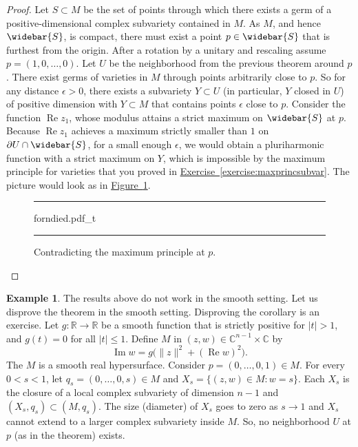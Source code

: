 \documentclass[12pt,openany]{book}
\renewcommand{\Re}{\operatorname{Re}}
\renewcommand{\Im}{\operatorname{Im}}
\newcommand{\sabs}[1]{\lvert {#1} \rvert}
\newcommand{\snorm}[1]{\lVert {#1} \rVert}
\newcommand{\C}{{\mathbb{C}}}
\newcommand{\R}{{\mathbb{R}}}
\theoremstyle{plain}
\theoremstyle{remark}
\theoremstyle{definition}
\newenvironment{myfig}{%
\begin{figure}[h!t]
\noindent\rule{\textwidth}{0.5pt}\vspace{12pt}\par\centering}%
{\par\noindent\rule{\textwidth}{0.5pt}
\end{figure}}
\theoremstyle{exercise}
\theoremstyle{example}
\newtheorem{example}[thm]{Example}
\newcommand{\figureref}[1]{\hyperref[#1]{Figure~\ref*{#1}}}
\newcommand{\exerciseref}[1]{\hyperref[#1]{Exercise~\ref*{#1}}}
\begin{document}
\begin{proof}
Let $S \subset M$ be the set of points through which there exists
a germ of a positive-dimensional complex subvariety contained in $M$.
As $M$, and hence $\widebar{S}$, is compact,
there must exist a point $p \in \widebar{S}$
that is furthest from
the origin.  After a rotation by a unitary and rescaling assume
$p=(1,0,\ldots,0)$.  Let $U$ be the neighborhood from the previous
theorem around $p$.  There exist germs of varieties in $M$ through points
arbitrarily close to $p$.  So for any distance $\epsilon > 0$,
there exists a subvariety $Y \subset U$ (in particular, $Y$ closed in $U$)
of positive dimension with $Y \subset M$ that contains points
$\epsilon$ close to $p$.  Consider the function $\Re z_1$, whose modulus attains a
strict maximum on $\widebar{S}$ at $p$.  Because $\Re z_1$ achieves a maximum
strictly smaller than $1$ on $\partial U \cap \widebar{S}$, for a small enough $\epsilon$,
we would obtain a pluriharmonic function with a strict
maximum on $Y$, which is impossible by the maximum principle for
varieties that you proved in \exerciseref{exercise:maxprincsubvar}.
The picture would look as in \figureref{fig:forndied}.
\begin{myfig}
\medskip
{forndied.pdf_t}
\caption{Contradicting the maximum principle at $p$.\label{fig:forndied}}
\end{myfig}
\end{proof}

\begin{example}
The results above do not work
in the smooth setting.  Let us disprove the theorem in the smooth
setting.  Disproving the corollary is an exercise.
Let $g \colon \R \to \R$ be a smooth function that is
strictly positive for $\sabs{t} > 1$, and $g(t) = 0$ for all $\sabs{t} \leq 1$.
Define $M$ in $(z,w) \in \C^{n-1} \times \C$ by
\begin{equation*}
\Im w = g\bigl(\snorm{z}^2 + (\Re w)^2\bigr) .
\end{equation*}
The $M$ is a smooth real hypersurface.
Consider $p = (0,\ldots,0,1) \in M$.  For every $0 < s < 1$, let
$q_s = (0,\ldots,0,s) \in M$ and $X_s = \bigl\{ (z,w) \in M :
w = s \bigr\}$.  Each $X_s$ is the closure of a local complex subvariety of dimension $n-1$
and $(X_s,q_s) \subset (M,q_s)$.  The size (diameter) of $X_s$ goes to
zero as $s \to 1$ and $X_s$ cannot extend to a
larger complex subvariety inside $M$.  So, no neighborhood $U$ at
$p$ (as in the theorem) exists.
\end{example}
\end{document}

